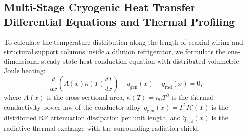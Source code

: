 \subsection{Multi-Stage Cryogenic Heat Transfer Differential Equations and Thermal Profiling}
\label{sec:cryo_differential_equations}

To calculate the temperature distribution along the length of coaxial wiring and structural support columns inside a dilution refrigerator, we formulate the one-dimensional steady-state heat conduction equation with distributed volumetric Joule heating:
\begin{equation}
    \frac{d}{dx} \left( A(x) \kappa(T) \frac{dT}{dx} \right) + \dot{q}_{\text{gen}}(x) - \dot{q}_{\text{rad}}(x) = 0,
    \label{eq:heat_conduction_differential}
\end{equation}
where $A(x)$ is the cross-sectional area, $\kappa(T) = \kappa_0 T^\beta$ is the thermal conductivity power law of the conductor alloy, $\dot{q}_{\text{gen}}(x) = I_{\text{rf}}^2 R'(T)$ is the distributed RF attenuation dissipation per unit length, and $\dot{q}_{\text{rad}}(x)$ is the radiative thermal exchange with the surrounding radiation shield.

